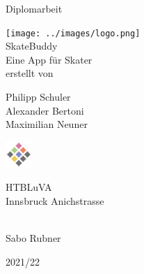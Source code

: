 \begin{titlepage}
	\begin{center}
		\Large{Diplomarbeit} \\

		\bigskip
		\bigskip
		\bigskip

		\texttt{[image: ../images/logo.png]} \\
		\Huge{SkateBuddy} \\
		\bigskip
		\bigskip
		\bigskip
		\huge{Eine App für Skater} \\

		\bigskip
		\bigskip
		\bigskip
		\large{erstellt von} \\

		\bigskip
		\bigskip
		\bigskip

		\Huge{Philipp Schuler} \\
		\Huge{Alexander Bertoni} \\
		\Huge{Maximilian Neuner} \\
		\bigskip
		\bigskip
		\bigskip


		\bigskip
		\bigskip

		\includegraphics[width=1cm]{../images/htl-logo}

		\Large{HTBLuVA} \\
		\Large{Innsbruck Anichstrasse} \\

		\bigskip
		\bigskip
		\bigskip

		 \\
		Sabo Rubner

		\bigskip
		\bigskip
		\bigskip
		\bigskip

		\Large{2021/22}

	\end{center}

\end{titlepage}